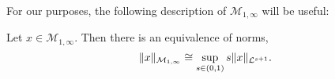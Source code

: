 For our purposes, the following description of $\mathcal{M}_{1,\infty}$ will
be useful:
\begin{proposition}
    Let $x \in \mathcal{M}_{1,\infty}$. Then there is an equivalence of norms,
    \begin{equation}
        \|x\|_{\mathcal{M}_{1,\infty}} \cong \sup_{s \in (0,1)} s\|x\|_{\mathcal{L}^{s+1}}.
    \end{equation}
\end{proposition}

